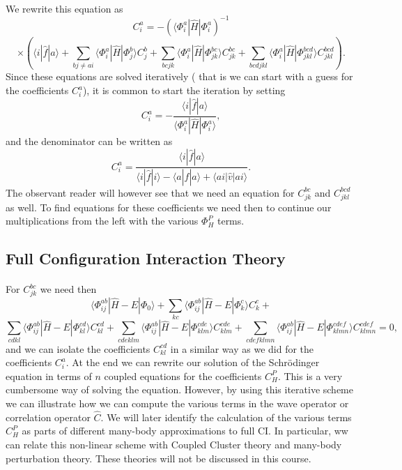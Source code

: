\documentclass[%
twoside,                 %
final,                   %
10pt]{article}
\begin{document}
\paragraph{}
We rewrite this equation as
\[
C_{i}^{a}=-(\langle \Phi_i^a | \hat{H}|\Phi_{i}^{a})^{-1}
\]
\[
\times\left(\langle i | \hat{f}| a\rangle+ \sum_{bj\ne ai}\langle \Phi_i^a | \hat{H}|\Phi_{j}^{b} \rangle C_{j}^{b}+\sum_{bcjk}\langle \Phi_i^a | \hat{H}|\Phi_{jk}^{bc} \rangle C_{jk}^{bc}+
\sum_{bcdjkl}\langle \Phi_i^a | \hat{H}|\Phi_{jkl}^{bcd} \rangle C_{jkl}^{bcd}\right).
\]
Since these equations are solved iteratively ( that is we can start with a guess for the coefficients $C_i^a$), it is common to start the  iteration 
by setting 
\[
 C_{i}^{a}=-\frac{\langle i | \hat{f}| a\rangle}{\langle \Phi_i^a | \hat{H}|\Phi_{i}^{a}\rangle},
\]
and the denominator can be written as
\[
  C_{i}^{a}=\frac{\langle i | \hat{f}| a\rangle}{\langle i | \hat{f}| i\rangle-\langle a | \hat{f}| a\rangle+\langle ai | \hat{v}| ai\rangle}.
\]
The observant reader will however see that we need an equation for $C_{jk}^{bc}$ and $C_{jkl}^{bcd}$ as well.
To find equations for these coefficients we need then to continue our multiplications from the left with the various
$\Phi_{H}^P$ terms.



\subsection{Full Configuration Interaction Theory}

\paragraph{}
For $C_{jk}^{bc}$ we need then
\[
\langle \Phi_{ij}^{ab} | \hat{H} -E| \Phi_0\rangle + \sum_{kc}\langle \Phi_{ij}^{ab} | \hat{H} -E|\Phi_{k}^{c} \rangle C_{k}^{c}+
\]
\[
\sum_{cdkl}\langle \Phi_{ij}^{ab} | \hat{H} -E|\Phi_{kl}^{cd} \rangle C_{kl}^{cd}+\sum_{cdeklm}\langle \Phi_{ij}^{ab} | \hat{H} -E|\Phi_{klm}^{cde} \rangle C_{klm}^{cde}+\sum_{cdefklmn}\langle \Phi_{ij}^{ab} | \hat{H} -E|\Phi_{klmn}^{cdef} \rangle C_{klmn}^{cdef}=0,
\]
and we can isolate the coefficients $C_{kl}^{cd}$ in a similar way as we did for the coefficients $C_{i}^{a}$. 
At the end we can rewrite our solution of the Schr\"odinger equation in terms of $n$ coupled equations for the coefficients $C_H^P$.
This is a very cumbersome way of solving the equation. However, by using this iterative scheme we can illustrate how we can compute the
various terms in the wave operator or correlation operator $\hat{C}$. We will later identify the calculation of the various terms $C_H^P$
as parts of different many-body approximations to full CI. In particular, ww can  relate this non-linear scheme with Coupled Cluster theory and
many-body perturbation theory. These theories will not be discussed in this course.
\end{document}
